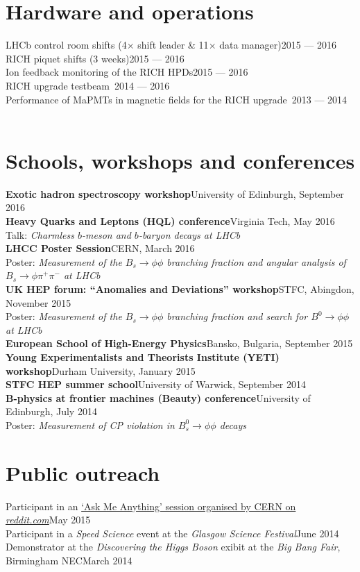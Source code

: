 \documentclass[contbibnum]{simplecv}
\newcommand\dateditem[2]{#1\hfill#2\\}
\newcommand\topictitle[3]{\dateditem{{\textbf{#1}}}{#3}#2}
\begin{document}
	\section{Hardware and operations}
	\dateditem{LHCb control room shifts (4$\times$ shift leader \& 11$\times$ data manager)}{2015 --- 2016}
	\dateditem{RICH piquet shifts (3 weeks)}{2015 --- 2016}
	\dateditem{Ion feedback monitoring of the RICH HPDs}{2015 --- 2016}
	\dateditem{RICH upgrade testbeam~\cite{testbeam}}{2014 --- 2016}
	\dateditem{Performance of MaPMTs in magnetic fields for the RICH upgrade~\cite{mapmt}}{2013 --- 2014}\\[-3em]
	\section{Schools, workshops and conferences}
	\topictitle{Exotic hadron spectroscopy workshop}{}{University of Edinburgh, September 2016}[0.5em]
	\topictitle{Heavy Quarks and Leptons (HQL) conference}{Talk: \textit{Charmless $b$-meson and $b$-baryon decays at LHCb}~\cite{HQL}}{Virginia Tech, May 2016}\\[0.5em]
	\topictitle{LHCC Poster Session}{Poster: \textit{Measurement of the $B_s \to \phi \phi$ branching fraction and angular analysis of $B_s \to \phi \pi^{+} \pi^{-}$ at LHCb}}{CERN, March 2016}\\[0.5em]
	\topictitle{UK HEP forum: ``Anomalies and Deviations'' workshop}{Poster: \textit{Measurement of the $B_s \to \phi \phi$ branching fraction and search for $B^0 \to \phi \phi$ at LHCb}}{STFC, Abingdon, November 2015}\\[0.5em]
	\topictitle{European School of High-Energy Physics}{}{Bansko, Bulgaria, September 2015}[0.5em]
	\topictitle{Young Experimentalists and Theorists Institute (YETI) workshop}{}{Durham University, January 2015}[0.5em]
	\topictitle{STFC HEP summer school}{}{University of Warwick, September 2014}[0.5em]
	\topictitle{B-physics at frontier machines (Beauty) conference}{Poster: \textit{Measurement of CP violation in $B^0_s \to \phi\phi$ decays~\cite{beauty}}}{University of Edinburgh, July 2014}\\[-2em]
	\section{Public outreach}
	\dateditem{Participant in an \href{http://cds.cern.ch/record/2024978}{`Ask Me Anything' session organised by CERN on \textit{reddit.com}}}{May 2015}
	\dateditem{Participant in a \textit{Speed Science} event at the \textit{Glasgow Science Festival}}{June 2014}
	\dateditem{Demonstrator at the \textit{Discovering the Higgs Boson} exibit at the \textit{Big Bang Fair}, Birmingham NEC}{March 2014}
	\vspace{-2em}
\end{document}

